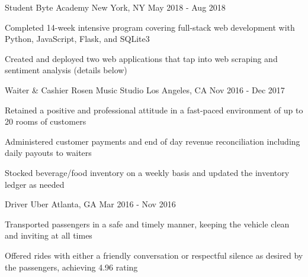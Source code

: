 

\begin{cventries}

  \cventry
    {Student} %
    {Byte Academy} %
    {New York, NY} %
    {May 2018 - Aug 2018} %
    {
      \begin{cvitems} %
        \item {Completed 14-week intensive program covering full-stack web development with Python, JavaScript, Flask, and SQLite3}
        \item {Created and deployed two web applications that tap into web scraping and sentiment analysis (details below)}
      \end{cvitems}
    }

  \cventry
    {Waiter \& Cashier} %
    {Rosen Music Studio} %
    {Los Angeles, CA} %
    {Nov 2016 - Dec 2017} %
    {
      \begin{cvitems} %
        \item {Retained a positive and professional attitude in a fast-paced environment of up to 20 rooms of customers}
        \item {Administered customer payments and end of day revenue reconciliation including daily payouts to waiters}
        \item {Stocked beverage/food inventory on a weekly basis and updated the inventory ledger as needed}
      \end{cvitems}
    }

  \cventry
    {Driver} %
    {Uber} %
    {Atlanta, GA} %
    {Mar 2016 - Nov 2016} %
    {
      \begin{cvitems} %
        \item {Transported passengers in a safe and timely manner, keeping the vehicle clean and inviting at all times}
        \item {Offered rides with either a friendly conversation or respectful silence as desired by the passengers, achieving 4.96 rating}
      \end{cvitems}
    }


\end{cventries}
